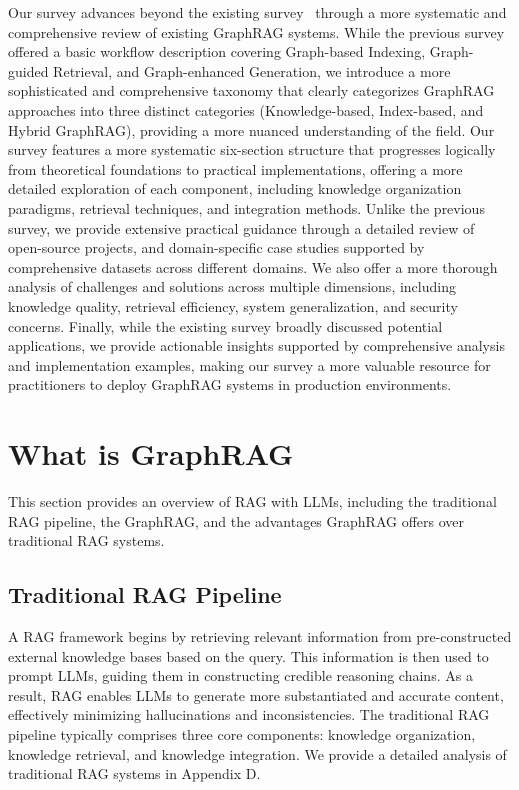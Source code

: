 \documentclass[lettersize,journal]{IEEEtran}
\begin{document}
Our survey advances beyond the existing survey~\cite{peng2024graph,procko2024graph,han2024retrieval} through a more systematic and comprehensive review of existing GraphRAG systems. While the previous survey offered a basic workflow description covering Graph-based Indexing, Graph-guided Retrieval, and Graph-enhanced Generation, we introduce a more sophisticated and comprehensive taxonomy that clearly categorizes GraphRAG approaches into three distinct categories (Knowledge-based, Index-based, and Hybrid GraphRAG), providing a more nuanced understanding of the field. Our survey features a more systematic six-section structure that progresses logically from theoretical foundations to practical implementations, offering a more detailed exploration of each component, including knowledge organization paradigms, retrieval techniques, and integration methods. Unlike the previous survey, we provide extensive practical guidance through a detailed review of open-source projects, and domain-specific case studies supported by comprehensive datasets across different domains. We also offer a more thorough analysis of challenges and solutions across multiple dimensions, including knowledge quality, retrieval efficiency, system generalization, and security concerns. Finally, while the existing survey broadly discussed potential applications, we provide actionable insights supported by comprehensive analysis and implementation examples, making our survey a more valuable resource for practitioners to deploy GraphRAG systems in production environments. 


\section{What is GraphRAG}\label{sec:def}
This section provides an overview of RAG with LLMs, including the traditional RAG pipeline, the GraphRAG, and the advantages GraphRAG offers over traditional RAG systems.

\subsection{Traditional RAG Pipeline}
A RAG framework begins by retrieving relevant information from pre-constructed external knowledge bases based on the query. This information is then used to prompt LLMs, guiding them in constructing credible reasoning chains. As a result, RAG enables LLMs to generate more substantiated and accurate content, effectively minimizing hallucinations and inconsistencies. The traditional RAG pipeline typically comprises three core components: knowledge organization, knowledge retrieval, and knowledge integration. We provide a detailed analysis of traditional RAG systems in Appendix D.
\end{document}
